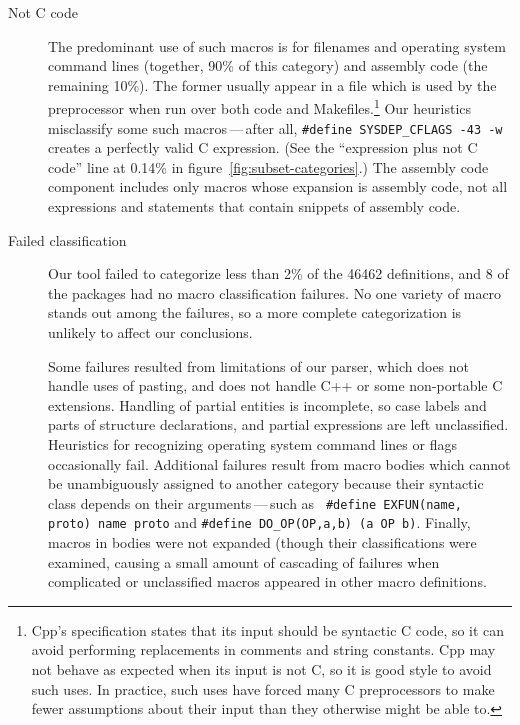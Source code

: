 \begin{description}
\item[Not C code]\label{page:not-c-code}
  The predominant use of such macros is for filenames and operating system
  command lines (together, 90\% of this category) and assembly code (the
  remaining 10\%).  The former usually appear in a file which is used by
  the preprocessor when run over both code and Makefiles.\footnote{Cpp's
    specification states that its input should be syntactic C code, so it
    can avoid performing replacements in comments and string constants.
    Cpp may not behave as expected when its input is not C, so it is good
    style to avoid such uses.  In practice, such uses have forced many C
    preprocessors to make fewer assumptions about their input than they
    otherwise might be able to.}  Our heuristics misclassify some such
  macros\,---\,after all, {\tt \#define \verb|SYSDEP_CFLAGS| -43 -w}
  creates a perfectly valid C expression.  (See the ``expression plus not C
  code'' line at 0.14\% in figure~\ref{fig:subset-categories}.)  The
  assembly code component includes only macros whose expansion is assembly
  code, not all expressions and statements that contain snippets of
  assembly code.

\item[Failed classification]
  Our tool failed to categorize less than 2\% of the 46462 definitions, and
  8 of the {\numpackages} packages had no macro classification failures.
  No one variety of macro stands out among the failures, so a more complete
  categorization is unlikely to affect our conclusions.
  
  Some failures resulted from limitations of our parser, which does not
  handle uses of pasting, and does not handle C++ or some non-portable C
  extensions.  Handling of partial entities is incomplete, so case labels
  and parts of structure declarations, and partial expressions are left
  unclassified.  Heuristics for recognizing operating system command lines
  or flags occasionally fail.  Additional failures result from macro
  bodies which cannot be unambiguously assigned to another category because
  their syntactic class depends on their arguments\,---\,such as {\tt
  \#define EXFUN(name, proto) name proto} and {\tt \#define
\verb|DO_OP|(OP,a,b) (a OP b)}.  Finally, macros in bodies were not
expanded (though their classifications were examined, causing a small
amount of cascading of failures when complicated or unclassified macros
appeared in other macro definitions.

\end{description}

